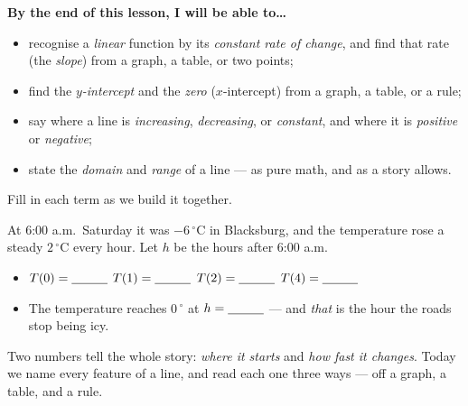 \documentclass[10pt]{article}
\begin{document}

\vspace{0.10in}

\begin{objectivebox}
\textbf{By the end of this lesson, I will be able to\dots}
\begin{itemize}\setlength{\itemsep}{2pt}
  \item recognise a \emph{linear} function by its \emph{constant rate of change}, and find that rate
        (the \emph{slope}) from a graph, a table, or two points;
  \item find the \emph{$y$-intercept} and the \emph{zero} ($x$-intercept) from a graph, a table, or a rule;
  \item say where a line is \emph{increasing}, \emph{decreasing}, or \emph{constant}, and where it is
        \emph{positive} or \emph{negative};
  \item state the \emph{domain} and \emph{range} of a line --- as pure math, and as a story allows.
\end{itemize}
\end{objectivebox}

\vspace{0.05in}

\begin{vocabbox}
\small
Fill in each term as we build it together.
\par\vspace{2pt}   %
\end{vocabbox}

\begin{hookbox}
At 6:00 a.m.\ Saturday it was $-6\,^\circ$C in Blacksburg, and the temperature rose a steady
$2\,^\circ$C every hour. Let $h$ be the hours after 6:00 a.m.
\begin{itemize}\setlength{\itemsep}{1pt}
  \item $T(0)=\blank{1.0cm}$ \quad $T(1)=\blank{1.0cm}$ \quad $T(2)=\blank{1.0cm}$ \quad $T(4)=\blank{1.0cm}$
  \item The temperature reaches $0\,^\circ$ at $h=\blank{1.0cm}$ --- and \emph{that} is the hour the
        roads stop being icy.
\end{itemize}
Two numbers tell the whole story: \emph{where it starts} and \emph{how fast it changes}. Today we
name every feature of a line, and read each one three ways --- off a graph, a table, and a rule.
\end{hookbox}
\end{document}
